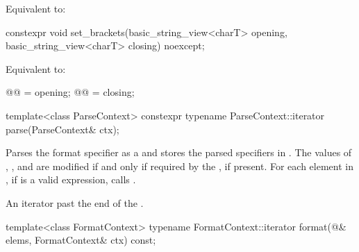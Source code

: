 \begin{itemdescr}
\pnum
\effects
Equivalent to: 
\end{itemdescr}

%
\begin{itemdecl}
constexpr void set_brackets(basic_string_view<charT> opening,
                            basic_string_view<charT> closing) noexcept;
\end{itemdecl}

\begin{itemdescr}
\pnum
\effects
Equivalent to:
\begin{codeblock}
@@ = opening;
@@ = closing;
\end{codeblock}
\end{itemdescr}

%
\begin{itemdecl}
template<class ParseContext>
  constexpr typename ParseContext::iterator
    parse(ParseContext& ctx);
\end{itemdecl}

\begin{itemdescr}
\pnum
\effects
Parses the format specifier as a  and
stores the parsed specifiers in .
The values of
,
, and
are modified if and only if
required by the , if present.
For each element  in ,
if  is a valid expression,
calls .

\pnum
\returns
An iterator past the end of the .
\end{itemdescr}

%
\begin{itemdecl}
template<class FormatContext>
  typename FormatContext::iterator
    format(@\seebelow@& elems, FormatContext& ctx) const;
\end{itemdecl}

